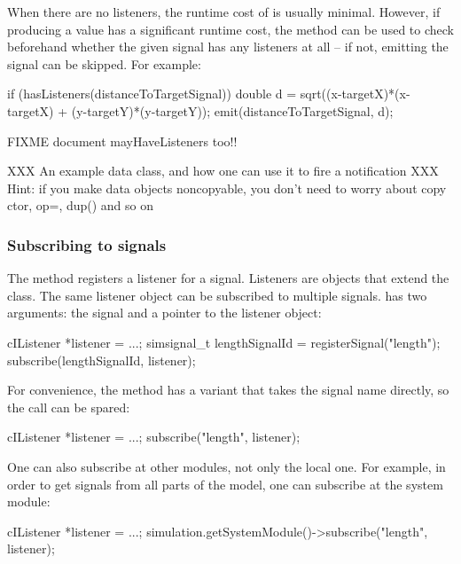 \begin{note}
\begin{note}
When there are no listeners, the runtime cost of  is usually minimal.
However, if producing a value has a significant runtime cost, the
 method can be used to check beforehand whether
the given signal has any listeners at all -- if not, emitting the signal
can be skipped. For example:

\begin{cpp}
if (hasListeners(distanceToTargetSignal))
{
    double d = sqrt((x-targetX)*(x-targetX) + (y-targetY)*(y-targetY));
    emit(distanceToTargetSignal, d);
}
\end{cpp}

FIXME document mayHaveListeners too!!

XXX An example data class, and how one can use it to fire a notification
XXX Hint: if you make data objects noncopyable, you don't need to worry about copy ctor, op=, dup() and so on


\subsubsection{Subscribing to signals}

The  method registers a listener for a signal.
Listeners are objects that extend the  class.
The same listener object can be subscribed to multiple signals.
 has two arguments: the signal and a pointer to
the listener object:

\begin{cpp}
cIListener *listener = ...;
simsignal_t lengthSignalId = registerSignal("length");
subscribe(lengthSignalId, listener);
\end{cpp}

For convenience, the  method has a variant
that takes the signal name directly, so the 
call can be spared:

\begin{cpp}
cIListener *listener = ...;
subscribe("length", listener);
\end{cpp}

One can also subscribe at other modules, not only the local one.
For example, in order to get signals from all parts of the model,
one can subscribe at the system module:

\begin{cpp}
cIListener *listener = ...;
simulation.getSystemModule()->subscribe("length", listener);
\end{cpp}


\end{note}
\end{note}
